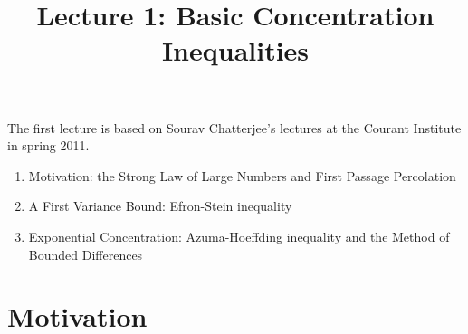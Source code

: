 \documentclass{amsart}
\title{Lecture 1: Basic Concentration Inequalities}
\theoremstyle{plain}
\theoremstyle{plain}
\theoremstyle{plain}
\theoremstyle{definition}
\theoremstyle{remark}
\begin{document}
The first lecture is based on Sourav Chatterjee's lectures at the Courant Institute in spring 2011. 
\begin{enumerate}
  \item Motivation: the Strong Law of Large Numbers and First Passage Percolation
  \item A First Variance Bound: Efron-Stein inequality
  \item Exponential Concentration: Azuma-Hoeffding inequality and the Method of Bounded Differences
\end{enumerate}
\section{Motivation}
\end{document}
